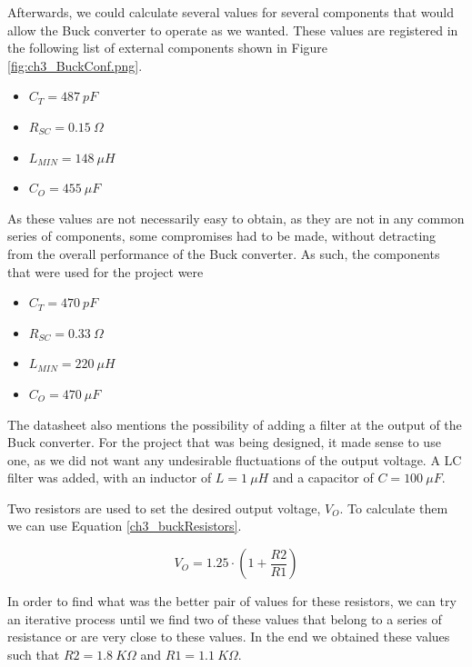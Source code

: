 \par Afterwards, we could calculate several values for several components that would allow the Buck converter to operate as we wanted. These values are registered in the following list of external components shown in Figure \ref{fig:ch3_BuckConf.png}.

\begin{itemize}
    \item $C_{T} = 487\:\si{pF}$
    \item $R_{SC} = 0.15\:\si{\Omega}$
    \item $L_{MIN} = 148 \:\si{\mu H}$
    \item $C_{O} = 455 \:\si{\mu F}$
\end{itemize}

\par As these values are not necessarily easy to obtain, as they are not in any common series of components, some compromises had to be made, without detracting from the overall performance of the Buck converter. As such, the components that were used for the project were

\begin{itemize}
    \item $C_{T} = 470\:\si{pF}$
    \item $R_{SC} = 0.33\:\si{\Omega}$
    \item $L_{MIN} = 220\:\si{\mu H}$
    \item $C_{O} = 470\:\si{\mu F}$
\end{itemize}

\par The datasheet also mentions the possibility of adding a filter at the output of the Buck converter. For the project that was being designed, it made sense to use one, as we did not want any undesirable fluctuations of the output voltage. A LC filter was added, with an inductor of $L = 1\:\si{\mu H}$ and a capacitor of $C = 100\:\si{\mu F}$.

\par Two resistors are used to set the desired output voltage, $V_{O}$. To calculate them we can use Equation \ref{ch3_buckResistors}.

\begin{equation}
    \label{ch3_buckResistors}
    V_{O} = 1.25\cdot\left(1+\frac{R2}{R1}\right)
\end{equation}

\par In order to find what was the better pair of values for these resistors, we can try an iterative process until we find two of these values that belong to a series of resistance or are very close to these values. In the end we obtained these values such that $R2 = 1.8\:\si{K\Omega}$ and $R1 = 1.1\:\si{K\Omega}$.


